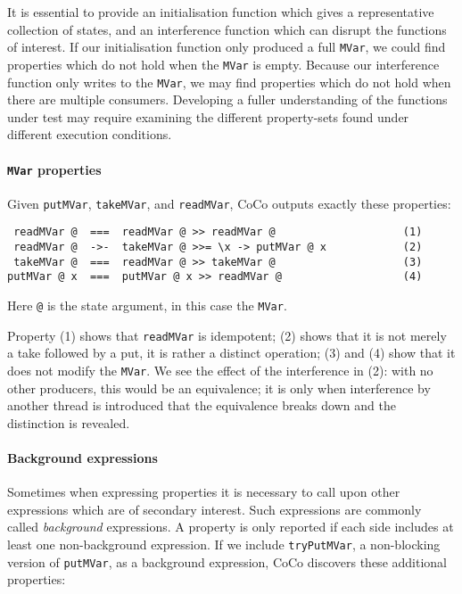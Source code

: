 It is essential to provide an initialisation function which gives a
representative collection of states, and an interference function
which can disrupt the functions of interest.  If our initialisation
function only produced a full \verb|MVar|, we could find properties
which do not hold when the \verb|MVar| is empty.  Because our
interference function only writes to the \verb|MVar|, we may find
properties which do not hold when there are multiple consumers.
Developing a fuller understanding of the functions under test may
require examining the different property-sets found under different
execution conditions.

\paragraph{\texttt{MVar} properties}
Given \verb|putMVar|, \verb|takeMVar|, and \verb|readMVar|, CoCo
outputs exactly these properties:

\begin{verbatim}
 readMVar @  ===  readMVar @ >> readMVar @                    (1)
 readMVar @  ->-  takeMVar @ >>= \x -> putMVar @ x            (2)
 takeMVar @  ===  readMVar @ >> takeMVar @                    (3)
putMVar @ x  ===  putMVar @ x >> readMVar @                   (4)
\end{verbatim}

\noindent
Here \verb|@| is the state argument, in this case the \verb|MVar|.

Property (1) shows that \verb|readMVar| is idempotent; (2) shows that
it is not merely a take followed by a put, it is rather a distinct
operation; (3) and (4) show that it does not modify the \verb|MVar|.
We see the effect of the interference in (2): with no other producers,
this would be an equivalence; it is only when interference by another
thread is introduced that the equivalence breaks down and the
distinction is revealed.

\paragraph{Background expressions}
Sometimes when expressing properties it is necessary to call upon
other expressions which are of secondary interest.  Such expressions
are commonly called \emph{background} expressions.  A property is only
reported if each side includes at least one non-background expression.
If we include \verb|tryPutMVar|, a non-blocking version of
\verb|putMVar|, as a background expression, CoCo discovers these
additional properties:

